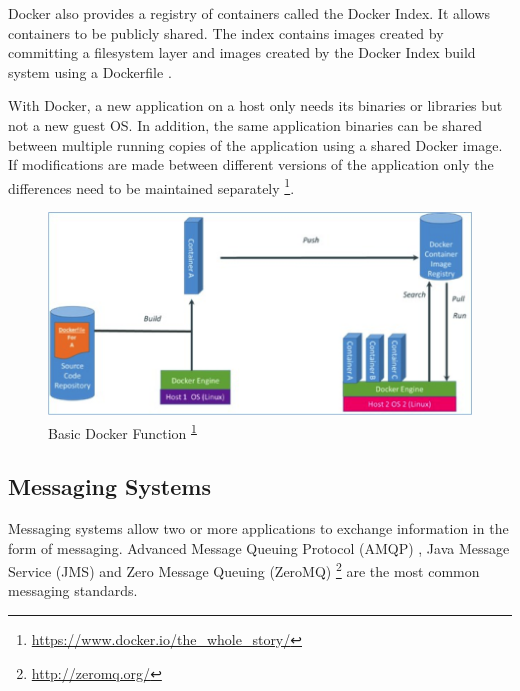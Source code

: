 \documentclass[a4paper,11pt,twoside]{article}
\begin{document}
Docker also provides a registry of containers called the Docker Index. It allows containers to be publicly shared. The index contains images created by committing a filesystem layer and images created by the Docker Index build system using a Dockerfile \cite{docker2}.
   
With Docker, a new application on a host only needs its binaries or libraries but not a new guest OS. In addition, the same application binaries can be shared between multiple running copies of the application using a shared Docker image. If modifications are made between different versions of the application only the differences need to be maintained separately \footnote{\label{dockerC} \url{https://www.docker.io/the_whole_story/}}. \bigskip

\begin{figure}[!ht]
  \centering
     \includegraphics[scale=1]{docker}
  \caption{Basic Docker Function \textsuperscript{\ref{dockerC}}} %
  \label{docker}
\end{figure}
\vspace{-18pt}


\noindent
\subsection{Messaging Systems} \label{MOM}
Messaging systems allow two or more applications to exchange information in the form of messaging. Advanced Message Queuing Protocol (AMQP) \cite{AMPQ}, Java Message Service (JMS) \cite{JMS} and Zero Message Queuing (ZeroMQ) \footnote{\label{ZeroMQ_1} \url{http://zeromq.org/}} are the most common messaging standards. 
\end{document}
